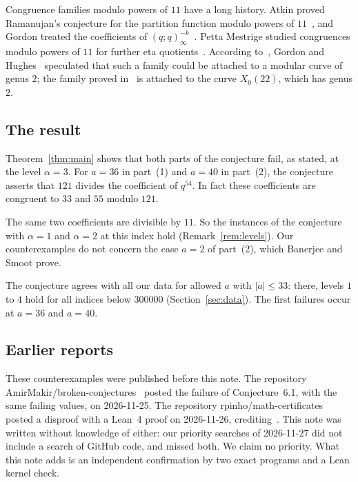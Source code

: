 \documentclass[11pt]{amsart}
\theoremstyle{definition}
\theoremstyle{remark}
\begin{document}
Congruence families modulo powers of \(11\) have a long history. Atkin proved Ramanujan's conjecture for the partition function modulo powers of \(11\)~\cite{Atkin}, and Gordon treated the coefficients of \((q;q)_\infty^{-k}\)~\cite{Gordon83}. Petta Mestrige studied congruences modulo powers of \(11\) for further eta quotients~\cite{PM}. According to~\cite{BS}, Gordon and Hughes~\cite{GH} speculated that such a family could be attached to a modular curve of genus \(2\); the family proved in~\cite{BS} is attached to the curve \(X_0(22)\), which has genus \(2\).

\subsection*{The result}
Theorem~\ref{thm:main} shows that both parts of the conjecture fail, as stated, at the level \(\alpha=3\). For \(a=36\) in part~(1) and \(a=40\) in part~(2), the conjecture asserts that \(121\) divides the coefficient of \(q^{54}\). In fact these coefficients are congruent to \(33\) and \(55\) modulo \(121\).

The same two coefficients are divisible by \(11\). So the instances of the conjecture with \(\alpha=1\) and \(\alpha=2\) at this index hold (Remark~\ref{rem:levels}). Our counterexamples do not concern the case \(a=2\) of part~(2), which Banerjee and Smoot prove.

The conjecture agrees with all our data for allowed \(a\) with \(|a|\le33\): there, levels \(1\) to \(4\) hold for all indices below \(300000\) (Section~\ref{sec:data}). The first failures occur at \(a=36\) and \(a=40\).

\subsection*{Earlier reports}
These counterexamples were published before this note. The repository AmirMakir/broken-conjectures~\cite{AM} posted the failure of Conjecture~6.1, with the same failing values, on 2026-11-25. The repository rpinho/math-certificates~\cite{RP} posted a disproof with a Lean~4 proof on 2026-11-26, crediting~\cite{AM}. This note was written without knowledge of either: our priority searches of 2026-11-27 did not include a search of GitHub code, and missed both. We claim no priority. What this note adds is an independent confirmation by two exact programs and a Lean kernel check.
\end{document}
